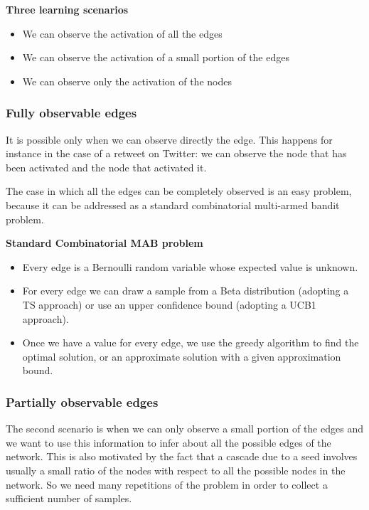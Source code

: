 \documentclass[10pt,a4paper]{article}
\begin{document}
\textbf{Three learning scenarios}

\begin{itemize}

\item We can observe the activation of all the edges
\item We can observe the activation of a small portion of the edges
\item We can observe only the activation of the nodes
\end{itemize}

\subsubsection{Fully observable edges}\label{fully-observable-edges}

It is possible only when we can observe directly the edge. This happens for instance in the case of a retweet on Twitter: we can observe the node that has been activated and the node that activated it.

The case in which all the edges can be completely observed is an easy problem, because it can be addressed as a standard combinatorial multi-armed bandit problem.
\newline

\textbf{Standard Combinatorial MAB problem}

\begin{itemize}

\item Every edge is a Bernoulli random variable whose expected value is unknown.
\item For every edge we can draw a sample from a Beta distribution (adopting a TS approach) or use an upper confidence bound (adopting a UCB1  approach).
\item Once we have a value for every edge, we use the greedy algorithm to find the optimal solution, or an approximate solution with a given approximation bound.
\end{itemize}

\subsubsection{Partially observable edges}\label{partially-observable-edges}

The second scenario is when we can only observe a small portion of the edges and we want to use this information to infer about all the possible edges of the network. This is also motivated by the fact that a cascade due to a seed involves usually a small ratio of the nodes with respect to all the possible nodes in the network. So we need many repetitions of the problem in order to collect a sufficient number of samples.
\end{document}
